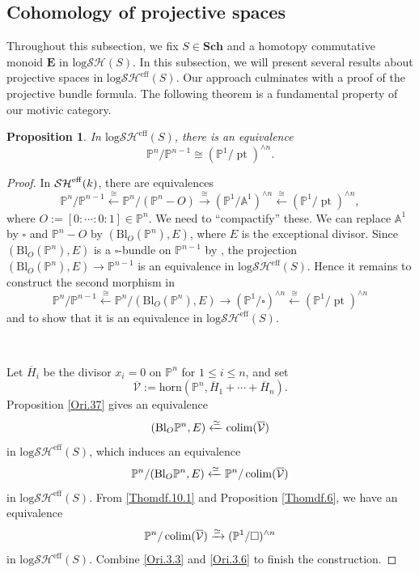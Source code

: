 \documentclass[11pt, a4paper]{amsart}
\newtheorem{prop}[thm]{Proposition}
\theoremstyle{definition}
\numberwithin{equation}{subsection}
\renewcommand{\P}{\mathbb{P}}
\newcommand{\A}{\mathbb{A}}
\newcommand{\Sch}{\mathbf{Sch}}
\newcommand{\pt}[1]{\mathrm{\pt}_{#1}}
\newcommand{\colimit}{\mathop{\rm colim}}
\newcommand{\Blow}{{\mathrm{Bl}}}
\newcommand{\ol}{\overline}
\newcommand{\cV}{\mathcal{V}}
\newcommand{\boxx}{\square}
\def\pt{\operatorname{pt}}
\newcommand{\eff}{{\rm eff}}
\newcommand{\ringE}{\mathbf{E}}
\newcommand{\horn}{\mathrm{horn}}
\newcommand{\infSHS}{\mathcal{SH}^{\eff}}
\newcommand{\inflogSH}{\mathrm{log}\mathcal{SH}}
\newcommand{\inflogSHS}{\mathrm{log}\mathcal{SH}^{\mathrm{eff}}}
\begin{document}
\subsection{Cohomology of projective spaces}
Throughout this subsection, we fix $S\in \Sch$ and a homotopy commutative monoid $\ringE$ in $\inflogSH(S)$.
In this subsection, we will present several results about projective spaces in $\inflogSHS(S)$.
Our approach culminates with a proof of the projective bundle formula.
The following theorem is a fundamental property of our motivic category.
\begin{prop}
\label{Ori.3}
In $\inflogSHS(S)$, there is an equivalence
\begin{equation}
\label{Ori.3.1}
\P^n/\P^{n-1}
\cong
(\P^1/\pt)^{\wedge n}.
\end{equation}
\end{prop}
\begin{proof}
In $\infSHS(k)$, there are equivalences
\[
\P^n/\P^{n-1}
\xleftarrow{\cong}
\P^n/(\P^n-O)
\xrightarrow{\cong}
(\P^1/\A^1)^{\wedge n}
\xleftarrow{\cong}
(\P^1/\pt)^{\wedge n},
\]
where $O:=[0:\cdots:0:1]\in \P^n$.
We need to ``compactify'' these.
We can replace $\A^1$ by $\boxx$ and $\P^n-O$ by $(\Blow_O(\P^n),E)$, where $E$ is the exceptional divisor.
Since $(\Blow_O(\P^n),E)$ is a $\boxx$-bundle on $\P^{n-1}$ by \cite[Lemma 7.1.7]{logDM}, the projection $(\Blow_O(\P^n),E)\to \P^{n-1}$ is an equivalence in $\inflogSHS(S)$.
Hence it remains to construct the second morphism in
\[
\P^n/\P^{n-1}
\xleftarrow{\cong}
\P^n/(\Blow_O(\P^n),E)
\to
(\P^1/\boxx)^{\wedge n}
\xleftarrow{\cong}
(\P^1/\pt)^{\wedge n}
\]
and to show that it is an equivalence in $\inflogSHS(S)$.

\

Let $\ol{H}_i$ be the divisor $x_i=0$ on $\P^n$ for $1\leq i\leq n$, 
and set
\[
\ol{\cV}
:=
\horn(\P^n,\ol{H}_1+\cdots+\ol{H}_n).
\]
Proposition \ref{Ori.37} gives an equivalence
\begin{equation}
\label{Ori.3.2}
(\Blow_O\P^n,E)
\xleftarrow{\simeq}
\colimit(\ol{\cV})
\end{equation}
in $\inflogSHS(S)$, which induces an equivalence
\begin{equation}
\label{Ori.3.3}
\P^n/(\Blow_O\P^n,E)
\xleftarrow{\simeq}
\P^n/\colimit(\ol{\cV})
\end{equation}
in $\inflogSHS(S)$.
From \eqref{Thomdf.10.1} and Proposition \ref{Thomdf.6}, we have an equivalence
\begin{equation}
\label{Ori.3.6}
\P^n/\colimit(\ol{\cV})
\xrightarrow{\simeq}
(\P^1/\boxx)^{\wedge n}
\end{equation}
in $\inflogSHS(S)$.
Combine \eqref{Ori.3.3} and \eqref{Ori.3.6} to finish the construction.
\end{proof}
\end{document}
